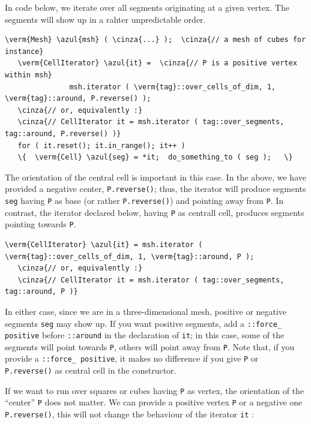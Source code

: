 In code below, we iterate over all segments originating at a given vertex.
The segments will show up in a rahter unpredictable order.

\begin{Verbatim}[commandchars=\\\{\},formatcom=\small\tt,
   baselinestretch=0.94,framesep=2mm                      ]
   \verm{Mesh} \azul{msh} ( \cinza{...} );  \cinza{// a mesh of cubes for instance}
   \verm{CellIterator} \azul{it} =  \cinza{// P is a positive vertex within msh}
               msh.iterator ( \verm{tag}::over_cells_of_dim, 1, \verm{tag}::around, P.reverse() );
   \cinza{// or, equivalently :}
   \cinza{// CellIterator it = msh.iterator ( tag::over_segments, tag::around, P.reverse() )}
   for ( it.reset(); it.in_range(); it++ )
   \{  \verm{Cell} \azul{seg} = *it;  do_something_to ( seg );   \}
\end{Verbatim}

The orientation of the central cell is important in this case.
In the above, we have provided a negative center, {\small\tt P.reverse()};
thus, the iterator will produce segments {\small\tt seg} having {\small\tt P} as base
(or rather {\small\tt P.reverse()}) and pointing away from {\small\tt P}.
In contrast, the iterator declared below, having {\small\tt P} as centrall cell,
produces segments pointing towards {\small\tt P}.

\begin{Verbatim}[commandchars=\\\{\},formatcom=\small\tt,
   baselinestretch=0.94,framesep=2mm                      ]
   \verm{CellIterator} \azul{it} = msh.iterator ( \verm{tag}::over_cells_of_dim, 1, \verm{tag}::around, P );
   \cinza{// or, equivalently :}
   \cinza{// CellIterator it = msh.iterator ( tag::over_segments, tag::around, P )}
\end{Verbatim}

In either case, since we are in a three-dimensional mesh, positive or negative segments
{\small\tt seg} may show up.
If you want positive segments, add a {\small\tt{}::force\_\,positive} before
{\small\tt{}::around} in the declaration of {\small\tt it};
in this case, some of the segments will point towards {\small\tt P},
others will point away from {\small\tt P}.
Note that, if you provide a {\small\tt{}::force\_\,positive}, it makes no difference
if you give {\small\tt P} or {\small\tt P.reverse()} as central cell in the constructor.

If we want to run over squares or cubes having {\small\tt P} as vertex,
the orientation of the ``center'' {\small\tt P} does not matter.
We can provide a positive vertex {\small\tt P} or a negative one {\small\tt P.reverse()},
this will not change the behaviour of the iterator {\small\tt it} :

